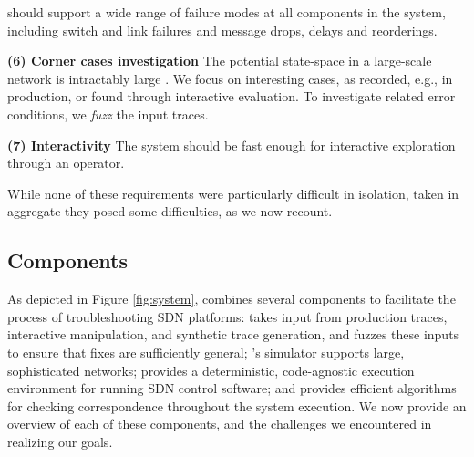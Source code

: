  \projectname{} should
support a wide range of failure modes at all components in the
system, including switch and link failures and message drops, delays and reorderings.

\noindent\textbf{(6) Corner cases investigation} The potential state-space in a large-scale network
is intractably large .  We focus on interesting cases, as recorded, e.g., in production, or
found through interactive evaluation. To investigate related error conditions,
we \emph{fuzz} the input traces.

\noindent\textbf{(7) Interactivity} The system should be fast enough for interactive exploration through
an operator.

\medskip

While none of these requirements were particularly difficult in isolation, taken in aggregate they posed some difficulties, as we now recount.

\subsection{Components}

As depicted in Figure \ref{fig:system}, \projectname{} combines several
components to facilitate the process of troubleshooting SDN platforms:
\projectname{} takes input
from production traces, interactive manipulation, and synthetic trace
generation, and fuzzes these inputs to ensure that fixes are sufficiently general;
\projectname{}'s simulator supports large, sophisticated networks;
\projectname{} provides a deterministic, code-agnostic execution environment
for running SDN control software; and provides efficient algorithms for
checking correspondence throughout the system execution. We now provide an
overview of each of these components, and the challenges we encountered in
realizing our goals.

